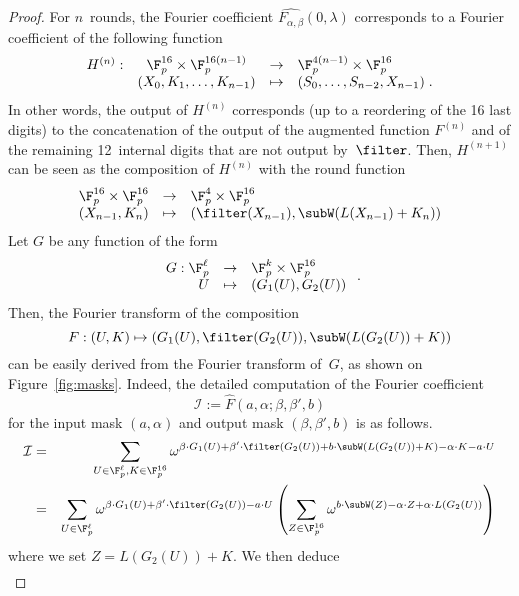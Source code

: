\begin{proof}
  For \(n\)~rounds, the Fourier coefficient $\widehat{F_{\alpha, \beta}}(0,\lambda)$ corresponds to a Fourier coefficient of the following function
    \[\begin{array}{rccl}
H^{(n)}: & \F_p^{16} \times \F_{p}^{16(n-1)} & \rightarrow & \F_{p}^{4(n-1)} \times \F_p^{16}\\
& (X_{0}, K_{1}, \ldots, K_{n-1}) & \mapsto & (S_0, \ldots, S_{n-2},X_{n-1})\;.
     \end{array}\]
 In other words, the output of \(H^{(n)}\) corresponds (up to a reordering of the 16 last digits) to the concatenation of the output of the augmented function \(F^{(n)}\) and of the remaining 12~internal digits that are not output by~$\filter$. %
 Then, \(H^{(n+1)}\) can be seen as the composition of \(H^{(n)}\) with the round function
 \[\begin{array}{rcl}
 \F_p^{16} \times \F_p^{16} & \rightarrow & \F_p^4 \times \F_p^{16}\\
 (X_{n-1},K_n) & \mapsto & \left(\filter(X_{n-1}), \subW(L(X_{n-1})+K_n)\right)\end{array}\]
 Let \(G\) be any function of the form
 \[\begin{array}{rcl}
 G:\F_p^{\ell} & \rightarrow & \F_p^k \times \F_p^{16}\\
 U & \mapsto & (G_1(U),G_2(U))\end{array}\;.\]
 Then, the Fourier transform of the composition
 \[F:(U,K) \mapsto (G_1(U), \filter(G_2(U)), \subW(L(G_2(U))+K))\]
 can be easily derived from the Fourier transform of~\(G\), as shown on Figure~\ref{fig:masks}.
 Indeed, the detailed computation of the Fourier coefficient
 \[\mathcal{I} := {\widehat F}(a, \alpha;\beta, \beta', b)\]
 for the input mask \((a, \alpha)\) and output mask \((\beta, \beta', b)\) is as follows.
 \begin{eqnarray*}
   \mathcal{I} & = & \sum_{U \in \F_p^\ell,K \in \F_p^{16}} \omega^{\beta \cdot G_1(U) + \beta' \cdot \filter(G_2(U)) + b \cdot \subW(L(G_2(U))+K) - \alpha \cdot K - a \cdot U} \\
   & = & \sum_{U \in \F_p^\ell} \omega^{\beta \cdot G_1(U) + \beta' \cdot \filter(G_2(U))- a \cdot U} \left(\sum_{Z \in \F_p^{16}} \omega^{b \cdot \subW(Z) -\alpha \cdot Z+ \alpha \cdot L(G_2(U))}\right)
 \end{eqnarray*}
 where we set \(Z = L(G_2(U))+K\).
 We then deduce
 \begin{eqnarray*}

\end{eqnarray*}
\end{proof}
